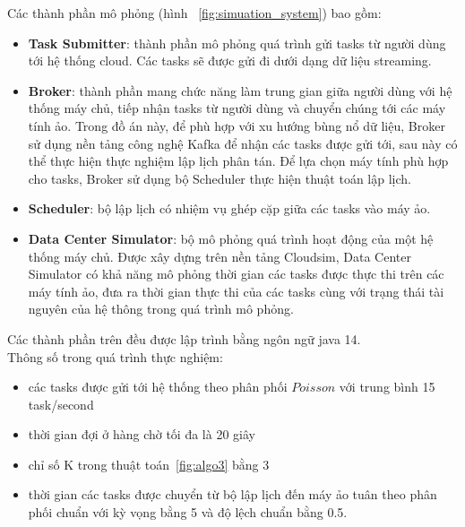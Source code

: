 \documentclass{my_style}
\begin{document}
\noindent
Các thành phần mô phỏng (hình ~\ref{fig:simuation_system}) bao gồm: 
\begin{itemize}
	\item \textbf{Task Submitter}: thành phần mô phỏng quá trình gửi tasks từ người dùng tới hệ thống cloud. Các tasks sẽ được gửi đi dưới dạng dữ liệu streaming. 
	\item \textbf{Broker}: thành phần mang chức năng làm trung gian giữa người dùng với hệ thống máy chủ, tiếp nhận tasks từ người dùng và chuyển chúng tới các máy tính ảo. Trong đồ án này, để phù hợp với xu hướng bùng nổ dữ liệu, Broker sử dụng nền tảng công nghệ Kafka để nhận các tasks được gửi tới, sau này có thể thực hiện thực nghiệm lập lịch phân tán. Để lựa chọn máy tính phù hợp cho tasks, Broker sử dụng bộ Scheduler thực hiện thuật toán lập lịch. 
	\item \textbf{Scheduler}: bộ lập lịch có nhiệm vụ ghép cặp giữa các tasks vào máy ảo.
	\item \textbf{Data Center Simulator}: bộ mô phỏng quá trình hoạt động của một hệ thống máy chủ. Được xây dựng trên nền tảng Cloudsim, Data Center Simulator có khả năng mô phỏng thời gian các tasks được thực thi trên các máy tính ảo, đưa ra thời gian thực thi của các tasks cùng với trạng thái tài nguyên của hệ thông trong quá trình mô phỏng.
\end{itemize}
Các thành phần trên đều được lập trình bằng ngôn ngữ java 14.\\
Thông số trong quá trình thực nghiệm: 
\begin{itemize}
	\item các tasks được gửi tới hệ thống theo phân phối $Poisson$ với trung bình 15 task/second
	\item thời gian đợi ở hàng chờ tối đa là 20 giây
	\item chỉ số K trong thuật toán~\ref{fig:algo3} bằng 3
	\item thời gian các tasks được chuyển từ bộ lập lịch đến máy ảo tuân theo phân phối chuẩn với kỳ vọng bằng 5 và độ lệch chuẩn bằng 0.5.
\end{itemize} 
\end{document}
